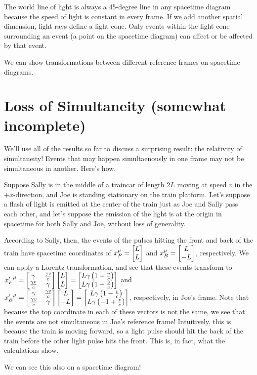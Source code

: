\documentclass[12pt]{scrartcl}
\begin{document}
The world line of light is always a 45-degree line in any spacetime diagram because the speed of light is constant in every frame. If we add another spatial dimension, light rays define a light cone. Only events within the light cone surrounding an event (a point on the spacetime diagram) can affect or be affected by that event.

We can show transformations between different reference frames on spacetime diagrams.

\section{Loss of Simultaneity (somewhat incomplete)}
We'll use all of the results so far to discuss a surprising result: the relativity of simultaneity! Events that may happen simultaenously in one frame may not be simultaneous in another. Here's how.

Suppose Sally is in  the middle of a traincar of length $2L$ moving at speed $v$ in the $+x$-direction, and Joe is standing stationary on the train platform. Let's suppose a flash of light is emitted at the center of the train just as Joe and Sally pass each other, and let's suppose the emission of the light is at the origin in spacetime for both Sally and Joe, without loss of generality.

According to Sally, then, the events of the pulses hitting the front and back of the train have spacetime coordinates of $x_F^\mu = \begin{bmatrix}L \\ L\end{bmatrix}$ and $x_B^\mu = \begin{bmatrix}L \\ -L\end{bmatrix}$, respectively. We can apply a Lorentz transformation, and see that these events transform to ${x'_F}^\mu = \begin{bmatrix}\gamma & \frac{\gamma v}{c} \\ \frac{\gamma v}{c} & \gamma\end{bmatrix}  \begin{bmatrix}L \\ L\end{bmatrix} =
	\begin{bmatrix}L\gamma\left(1+\frac{v}{c}\right) \\ L\gamma\left(1+\frac{v}{c}\right)\end{bmatrix}$ and
${x'_B}^\mu = \begin{bmatrix}\gamma & \frac{\gamma v}{c} \\ \frac{\gamma v}{c} & \gamma\end{bmatrix}  \begin{bmatrix}L \\ -L\end{bmatrix} = \begin{bmatrix}L\gamma\left(1-\frac{v}{c}\right) \\ L\gamma\left(-1+\frac{v}{c}\right)\end{bmatrix}$, respectively, in Joe's frame. Note that because the top coordinate in each of these vectors is not the same, we see that the events are not simultaneous in Joe's reference frame! Intuitively, this is because the train is moving forward, so a light pulse should hit the back of the train  before the other light pulse hits the front. This is, in fact, what the calculations show.

We can see this also on a spacetime diagram!
\end{document}
